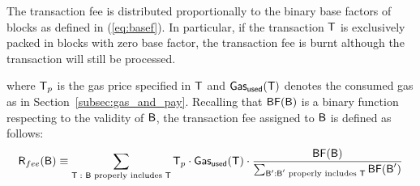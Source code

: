 The transaction fee is distributed proportionally to the binary base factors of blocks as defined in (\ref{eq:basef}). 
% 
In particular, if the transaction $\textsf{T}$ is exclusively packed in blocks with zero base factor, the transaction fee is burnt although the transaction will still be processed. 


where $\textsf{T}_p$ is the gas price specified in $\textsf{T}$ and $\mathsf{Gas_{used}}(\textsf{T})$ denotes the consumed gas as  in Section~\ref{subsec:gas_and_pay}.
Recalling that $\mathsf{BF}(\textsf{B})$ is a binary function respecting to the validity of $\textsf{B}$,
 the transaction fee assigned to $\textsf{B}$ is defined as follows:
\begin{align}\label{eq:txfee}
	\textsf{R}_{fee}(\textsf{B})\equiv
	 	\sum_{\text{$\textsf{T}:$ $\textsf{B}$ properly includes $\textsf{T}$}}
	\textsf{T}_p\cdot \mathsf{Gas_{used}}(\textsf{T}) \cdot 
	\frac{\mathsf{BF}(\textsf{B})}{\sum_{\textsf{B}': \text{$\textsf{B}'$ properly includes $\textsf{T}$}} \mathsf{BF}(\textsf{B}') } 
\end{align}

